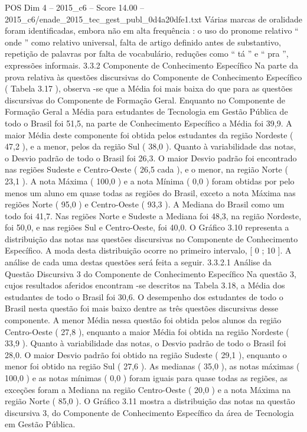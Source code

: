 \begin{textsample}{POS Dim 4 – 2015\_c6 – Score 14.00 – 2015\_c6/enade\_2015\_tec\_gest\_publ\_0d4a20dfe1.txt}
Várias marcas de oralidade foram identificadas, embora não em alta frequência : o uso do pronome relativo “ onde ” como relativo universal, falta de artigo definido antes de substantivo, repetição de palavras por falta de vocabulário, reduções como “ tá ” e “ pra ”, expressões informais. 3.3.2 Componente de Conhecimento Específico Na parte da prova relativa às questões discursivas do Componente de Conhecimento Específico ( Tabela 3.17 ), observa -se que a Média foi mais baixa do que para as questões discursivas do Componente de Formação Geral.
Enquanto no Componente de Formação Geral a Média para estudantes de Tecnologia em Gestão Pública de todo o Brasil foi 51,5, na parte de Conhecimento Específico a Média foi 39,9.
A maior Média deste componente foi obtida pelos estudantes da região Nordeste ( 47,2 ), e a menor, pelos da região Sul ( 38,0 ).
Quanto à variabilidade das notas, o Desvio padrão de todo o Brasil foi 26,3.
O maior Desvio padrão foi encontrado nas regiões Sudeste e Centro-Oeste ( 26,5 cada ), e o menor, na região Norte ( 23,1 ).
A nota Máxima ( 100,0 ) e a nota Mínima ( 0,0 ) foram obtidas por pelo menos um aluno em quase todas as regiões do Brasil, exceto a nota Máxima nas regiões Norte ( 95,0 ) e Centro-Oeste ( 93,3 ).
A Mediana do Brasil como um todo foi 41,7.
Nas regiões Norte e Sudeste a Mediana foi 48,3, na região Nordeste, foi 50,0, e nas regiões Sul e Centro-Oeste, foi 40,0.
O Gráfico 3.10 representa a distribuição das notas nas questões discursivas no Componente de Conhecimento Específico.
A moda desta distribuição ocorre no primeiro intervalo, [ 0 ; 10 ].
A análise de cada uma destas questões será feita a seguir. 3.3.2.1 Análise da Questão Discursiva 3 do Componente de Conhecimento Específico Na questão 3, cujos resultados aferidos encontram -se descritos na Tabela 3.18, a Média dos estudantes de todo o Brasil foi 30,6.
O desempenho dos estudantes de todo o Brasil nesta questão foi mais baixo dentre as três questões discursivas desse componente.
A menor Média nessa questão foi obtida pelos alunos da região Centro-Oeste ( 27,8 ), enquanto a maior Média foi obtida na região Nordeste ( 33,9 ).
Quanto à variabilidade das notas, o Desvio padrão de todo o Brasil foi 28,0.
O maior Desvio padrão foi obtido na região Sudeste ( 29,1 ), enquanto o menor foi obtido na região Sul ( 27,6 ).
As medianas ( 35,0 ), as notas máximas ( 100,0 ) e as notas mínimas ( 0,0 ) foram iguais para quase todas as regiões, as exceções foram a Mediana na região Centro-Oeste ( 20,0 ) e a nota Máxima na região Norte ( 85,0 ).
O Gráfico 3.11 mostra a distribuição das notas na questão discursiva 3, do Componente de Conhecimento Específico da área de Tecnologia em Gestão Pública.

\end{textsample}
